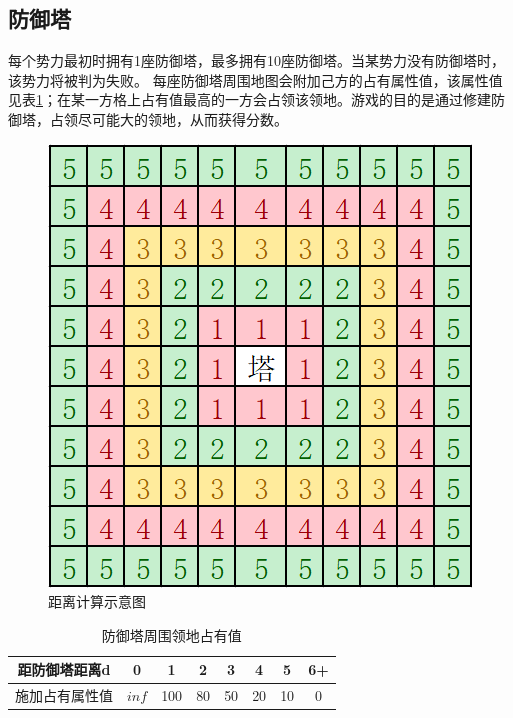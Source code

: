 \documentclass[a4paper,4pt]{article}
\begin{document}
\subsection{防御塔}
每个势力最初时拥有1座防御塔，最多拥有10座防御塔。当某势力没有防御塔时，该势力将被判为失败。
每座防御塔周围地图会附加己方的占有属性值，该属性值见表\ref{领地}；在某一方格上占有值最高的一方会占领该领地。游戏的目的是通过修建防御塔，占领尽可能大的领地，从而获得分数。
\begin{figure}[htbp]   %
  \centering
  \includegraphics[width=2.5 in]{距离.png}
  \caption{距离计算示意图}
  \label{jpg:示例图片2}
\end{figure}

\begin{table}[htbp]
  \centering
  \caption{防御塔周围领地占有值}
  \begin{tabular}{c|c|c|c|c|c|c|c}
    \hline
    距防御塔距离d  & 0     & 1   & 2  & 3  & 4  & 5  & 6+ \bigstrut \\
    \hline
    施加占有属性值 & $inf$ & 100 & 80 & 50 & 20 & 10 & 0 \bigstrut  \\
    \hline
  \end{tabular}%
  \label{领地}%
\end{table}%
\end{document}
